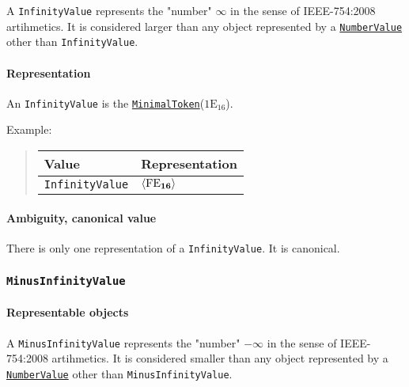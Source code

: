 \documentclass[headings=normal, headsepline, numbers=noenddot, fleqn, a4paper]{scrartcl}
\newcommand{\HexNumber}[1]{\mathrm{#1}_{16}}
\newcommand{\DborSyntaxIdent}[1]{\texttt{#1}}
\newcommand{\DborSyntaxIdentRef}[1]{\hyperlink{sec:def:#1}{\DborSyntaxIdent{#1}}}
\newcommand{\DborFirstByte}[2]{\mathbf{\textcolor{#1}{\HexNumber{#2}}}}
\newcommand{\DborFirstByteNumber}[1]{\DborFirstByte{black}{#1}}
\begin{document}
    A \DborSyntaxIdent{InfinityValue} represents the "number" $\infty$ in the sense of IEEE-754:2008 artihmetics.
    It is considered larger than any object represented by a \DborSyntaxIdentRef{NumberValue} 
    other than \DborSyntaxIdent{InfinityValue}.

    \paragraph{Representation}

    An \DborSyntaxIdent{InfinityValue} is the \DborSyntaxIdentRef{MinimalToken}($\HexNumber{1E}$).

    \smallskip
    \noindent
    Example:
    \nolinebreak
    \begin{quote}    
        \begin{tabular}{ll}
            \toprule
            Value & Representation \\
            \midrule
            \DborSyntaxIdent{InfinityValue} 
                & $\langle \DborFirstByteNumber{FE} \rangle$ \\
            \bottomrule
        \end{tabular}
    \end{quote}

    \paragraph{Ambiguity, canonical value}

    There is only one representation of a \DborSyntaxIdent{InfinityValue}.
    It is canonical.


    \subsubsection{\DborSyntaxIdent{MinusInfinityValue}}
    \label{sec:def:MinusInfinityValue}
    \hypertarget{sec:def:MinusInfinityValue}{}

    \paragraph{Representable objects}

    A \DborSyntaxIdent{MinusInfinityValue} represents the "number" $-\infty$ in the sense of IEEE-754:2008 artihmetics.
    It is considered smaller than any object represented by a \DborSyntaxIdentRef{NumberValue} 
    other than \DborSyntaxIdent{MinusInfinityValue}.
\end{document}
